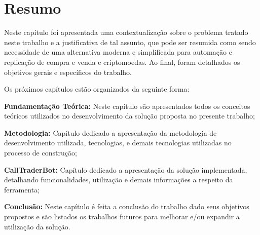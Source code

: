 \section*{Resumo}
Neste capítulo foi apresentada uma contextualização sobre o problema tratado neste trabalho e a justificativa de tal assunto, que pode ser resumida como sendo necessidade de uma alternativa moderna e simplificada para automação e replicação de compra e venda e criptomoedas. Ao final, foram detalhados os objetivos gerais e específicos do trabalho.

Os próximos capítulos estão organizados da seguinte forma:

\begin{lista}
  \item \textbf{Fundamentação Teórica:} Neste capítulo são apresentados todos os conceitos teóricos utilizados no desenvolvimento da solução proposta no presente trabalho;
  \item \textbf{Metodologia:} Capítulo dedicado a apresentação da metodologia de desenvolvimento utilizada, tecnologias, e demais tecnologias utilizadas no processo de construção;
  \item \textbf{CallTraderBot:} Capítulo dedicado a apresentação da solução implementada, detalhando funcionalidades, utilização e demais informações a respeito da ferramenta;
  \item \textbf{Conclusão:} Neste capítulo é feita a conclusão do trabalho dado seus objetivos propostos e são listados os trabalhos futuros para melhorar e/ou expandir a utilização da solução.
\end{lista}